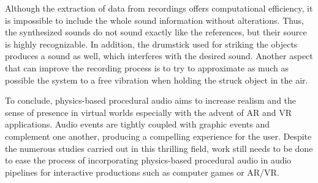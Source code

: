 Although the extraction of data from recordings offers computational efficiency, it is impossible to include the whole sound information without alterations. Thus, the synthesized sounds do not sound exactly like the references, but their source is highly recognizable. In addition, the drumstick used for striking the objects produces a sound as well, which interferes with the desired sound. Another aspect that can improve the recording process is to try to approximate as much as possible the system to a free vibration when holding the struck object in the air.

To conclude, physics-based procedural audio aims to increase realism and the sense of presence in virtual worlds especially with the advent of \gls{AR} and \gls{VR} applications. Audio events are tightly coupled with graphic events and complement one another, producing a compelling experience for the user. Despite the numerous studies carried out in this thrilling field, work still needs to be done to ease the process of incorporating physics-based procedural audio in audio pipelines for interactive productions such as computer games or \gls{AR}/\gls{VR}.